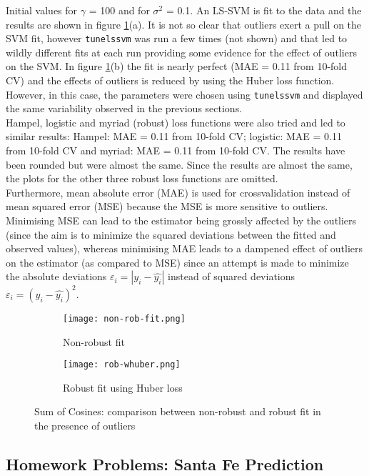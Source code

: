 \documentclass[paper=a4, fontsize=11pt]{scrartcl} %
\numberwithin{equation}{section} %
\begin{document}
Initial values for $\gamma$ = 100 and for $\sigma^2$ = 0.1. An LS-SVM is fit to the data and the results are shown in figure \ref{robust}(a). It is not so clear that outliers exert a pull on the SVM fit, however \texttt{tunelssvm} was run a few times (not shown) and that led to wildly different fits at each run providing some evidence for the effect of outliers on the SVM. In figure \ref{robust}(b) the fit is nearly perfect (MAE = 0.11 from 10-fold CV) and the effects of outliers is reduced by using the Huber loss function. However, in this case, the parameters were chosen using \texttt{tunelssvm} and displayed the same variability observed in the previous sections.\\

Hampel, logistic and myriad (robust) loss functions were also tried and led to similar results: Hampel: MAE = 0.11 from 10-fold CV; logistic: MAE = 0.11 from 10-fold CV and myriad: MAE = 0.11 from 10-fold CV. The results have been rounded but were almost the same. Since the results are almost the same, the plots for the other three robust loss functions are omitted.\\

Furthermore, mean absolute error (MAE) is used for crossvalidation instead of mean squared error (MSE) because the MSE is more sensitive to outliers. Minimising MSE can lead to the estimator being grossly affected by the outliers (since the aim is to minimize the squared deviations between the fitted and observed values), whereas minimising MAE leads to a dampened effect of outliers on the estimator (as compared to MSE) since an attempt is made to minimize the absolute deviations $\varepsilon_i = |y_i - \hat{y_i}|$ instead of squared deviations $\varepsilon_i = (y_i - \hat{y_i})^2$.

\begin{figure}[ht]
\centering
	\begin{subfigure}[b]{0.5\textwidth}
		\centering
		\texttt{[image: non-rob-fit.png]}
		\caption{Non-robust fit}
	\end{subfigure}%
	\begin{subfigure}[b]{0.5\textwidth}
		\centering
		\texttt{[image: rob-whuber.png]}
		\caption{Robust fit using Huber loss}
	\end{subfigure}
\caption{Sum of Cosines: comparison between non-robust and robust fit in the presence of outliers}
\label{robust}
\end{figure}

\subsection{Homework Problems: Santa Fe Prediction}
\end{document}
